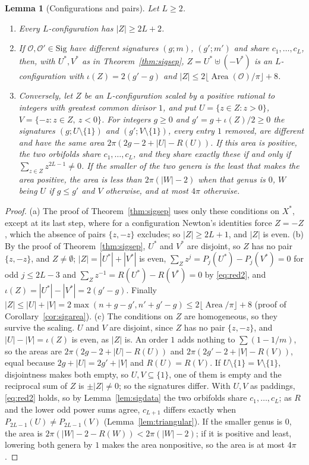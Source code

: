 \documentclass[pdflatex,sn-mathphys-num]{sn-jnl}
\theoremstyle{thmstyleone}%
\newtheorem{lemma}[theorem]{Lemma}%
\theoremstyle{thmstylethree}%
\newcommand{\Orb}{\mathcal{O}}
\newcommand{\Sig}{\mathrm{Sig}}
\newcommand{\Area}{\operatorname{Area}}
\begin{document}
\begin{lemma}[Configurations and pairs]\label{lem:realise}
Let $L\ge2$.
\begin{enumerate}[label=(\alph*)]
\item Every $L$-configuration has $|Z|\ge2L+2$.
\item If $\Orb,\Orb'\in\Sig$ have different signatures $(g;m)$, $(g';m')$ and share $c_1,\dots,c_L$, then, with $U^*,V^*$ as in Theorem~\ref{thm:sigsep}, $Z=U^*\uplus(-V^*)$ is an $L$-configuration with $\iota(Z)=2(g'-g)$ and $|Z|\le2\lfloor\Area(\Orb)/\pi\rfloor+8$.
\item Conversely, let $Z$ be an $L$-configuration scaled by a positive rational to integers with greatest common divisor $1$, and put $U=\{z\in Z:z>0\}$, $V=\{-z:z\in Z,\ z<0\}$. For integers $g\ge0$ and $g'=g+\iota(Z)/2\ge0$ the signatures $(g;U\setminus\{1\})$ and $(g';V\setminus\{1\})$, every entry $1$ removed, are different and have the same area $2\pi(2g-2+|U|-R(U))$. If this area is positive, the two orbifolds share $c_1,\dots,c_L$, and they share exactly these if and only if $\sum_{z\in Z}z^{2L-1}\ne0$. If the smaller of the two genera is the least that makes the area positive, the area is less than $2\pi(|W|-2)$ when that genus is $0$, $W$ being $U$ if $g\le g'$ and $V$ otherwise, and at most $4\pi$ otherwise.
\end{enumerate}
\end{lemma}

\begin{proof}
(a) The proof of Theorem~\ref{thm:sigsep} uses only these conditions on $X^*$, except at its last step, where for a configuration Newton's identities force $Z=-Z$, which the absence of pairs $\{z,-z\}$ excludes; so $|Z|\ge2L+1$, and $|Z|$ is even. (b) By the proof of Theorem~\ref{thm:sigsep}, $U^*$ and $V^*$ are disjoint, so $Z$ has no pair $\{z,-z\}$, and $Z\ne\emptyset$; $|Z|=|U^*|+|V^*|$ is even, $\sum_Zz^j=P_j(U^*)-P_j(V^*)=0$ for odd $j\le2L-3$ and $\sum_Zz^{-1}=R(U^*)-R(V^*)=0$ by \eqref{eq:red2}, and $\iota(Z)=|U^*|-|V^*|=2(g'-g)$. Finally $|Z|\le|U|+|V|=2\max(n+g-g',n'+g'-g)\le2\lfloor\Area/\pi\rfloor+8$ (proof of Corollary~\ref{cor:sigarea}). (c) The conditions on $Z$ are homogeneous, so they survive the scaling. $U$ and $V$ are disjoint, since $Z$ has no pair $\{z,-z\}$, and $|U|-|V|=\iota(Z)$ is even, as $|Z|$ is. An order $1$ adds nothing to $\sum(1-1/m)$, so the areas are $2\pi(2g-2+|U|-R(U))$ and $2\pi(2g'-2+|V|-R(V))$, equal because $2g+|U|=2g'+|V|$ and $R(U)=R(V)$. If $U\setminus\{1\}=V\setminus\{1\}$, disjointness makes both empty, so $U,V\subseteq\{1\}$, one of them is empty and the reciprocal sum of $Z$ is $\pm|Z|\ne0$; so the signatures differ. With $U,V$ as paddings, \eqref{eq:red2} holds, so by Lemma~\ref{lem:sigdata} the two orbifolds share $c_1,\dots,c_L$; as $R$ and the lower odd power sums agree, $c_{L+1}$ differs exactly when $P_{2L-1}(U)\ne P_{2L-1}(V)$ (Lemma~\ref{lem:triangular}). If the smaller genus is $0$, the area is $2\pi(|W|-2-R(W))<2\pi(|W|-2)$; if it is positive and least, lowering both genera by $1$ makes the area nonpositive, so the area is at most $4\pi$.
\end{proof}
\end{document}
